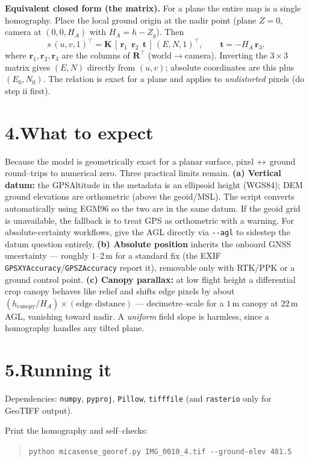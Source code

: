 \documentclass[10pt]{article}
\newcommand{\R}{\mathbf{R}}
\begin{document}
\textbf{Equivalent closed form (the matrix).} For a plane the entire map is a single homography. Place the local ground origin at the nadir point (plane $Z=0$, camera at $(0,0,H_{\!A})$ with $H_{\!A}=h-Z_g$). Then
\[
s\,(u,v,1)^{\!\top}=\mathbf{K}\,[\,\mathbf{r}_1\ \ \mathbf{r}_2\ \ \mathbf{t}\,]\,(E,N,1)^{\!\top},
\qquad \mathbf{t}=-H_{\!A}\,\mathbf{r}_3,
\]
where $\mathbf{r}_1,\mathbf{r}_2,\mathbf{r}_3$ are the columns of $\R^{\!\top}$ (world$\to$camera). Inverting the $3\times3$ matrix gives $(E,N)$ directly from $(u,v)$; absolute coordinates are this plus $(E_0,N_0)$. The relation is exact for a plane and applies to \emph{undistorted} pixels (do step ii first).

\section*{4.\quad What to expect}
Because the model is geometrically exact for a planar surface, pixel\,$\leftrightarrow$\,ground round--trips to numerical zero. Three practical limits remain. \textbf{(a) Vertical datum:} the GPSAltitude in the metadata is an ellipsoid height (WGS84); DEM ground elevations are orthometric (above the geoid/MSL). The script converts automatically using EGM96 so the two are in the same datum. If the geoid grid is unavailable, the fallback is to treat GPS as orthometric with a warning. For absolute-certainty workflows, give the AGL directly via \verb|--agl| to sidestep the datum question entirely. \textbf{(b) Absolute position} inherits the onboard GNSS uncertainty --- roughly $1$--$2$\,m for a standard fix (the EXIF \texttt{GPSXYAccuracy}/\texttt{GPSZAccuracy} report it), removable only with RTK/PPK or a ground control point. \textbf{(c) Canopy parallax:} at low flight height a differential crop canopy behaves like relief and shifts edge pixels by about $(h_{\mathrm{canopy}}/H_{\!A})\times(\text{edge distance})$ --- decimetre--scale for a $1$\,m canopy at $22$\,m AGL, vanishing toward nadir. A \emph{uniform} field slope is harmless, since a homography handles any tilted plane.

\section*{5.\quad Running it}
Dependencies: \texttt{numpy}, \texttt{pyproj}, \texttt{Pillow}, \texttt{tifffile} (and \texttt{rasterio} only for GeoTIFF output).

\noindent Print the homography and self--checks:
\begin{quote}\small\verb|python micasense_georef.py IMG_0010_4.tif --ground-elev 481.5|\end{quote}
\end{document}
